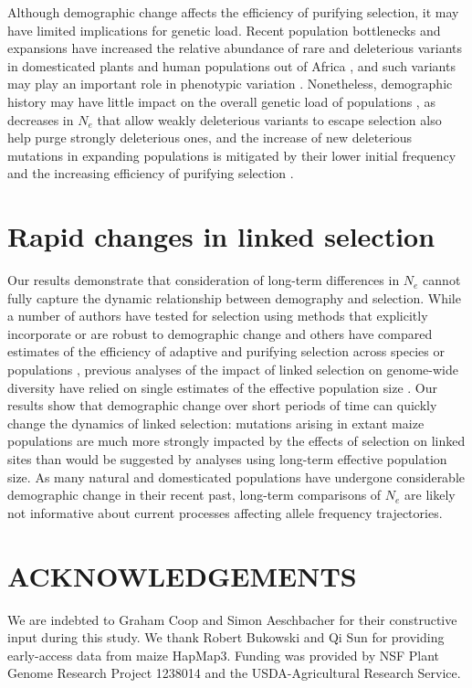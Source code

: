 \documentclass[12pt,a4paper]{article}
\begin{document}
Although demographic change affects the efficiency of purifying selection, it may have limited implications for genetic load. 
Recent population bottlenecks and expansions have increased the relative abundance of rare and 
deleterious variants in domesticated plants \cite{Gunther:2010gt,renaut2015} and human populations out of Africa \cite{keinan2012,coventry2010}, and such variants may play an important role in phenotypic variation \cite{Mezmouk:2014es, coventry2010, eyre2010}.
Nonetheless, demographic history may have little impact on the overall genetic load of populations \cite{do2015,simons2014}, as decreases in $N_e$ that allow weakly deleterious variants to escape selection also help purge strongly deleterious ones, and the increase of new deleterious mutations in expanding populations is mitigated by their lower initial frequency and the increasing efficiency of purifying selection \cite{gazave2013, simons2014, lohmueller2014}. 

\section*{Rapid changes in linked selection} %
Our results demonstrate that consideration of long-term differences in $N_e$ cannot fully capture the dynamic relationship between demography and selection. 
While a number of authors have tested for selection using methods that explicitly incorporate or are robust to demographic change \cite{eyre2009estimating, chen2010, zeng2010} and others have compared estimates of the efficiency of adaptive and purifying selection across species \cite{popadin2012} or populations \cite{Elyashiv:2010ga}, previous analyses of the impact of linked selection on genome-wide diversity have relied on single estimates of the effective population size \cite{corbett2015,leffler2012}.
Our results show that demographic change over short periods of time can quickly change the dynamics of linked selection: mutations arising in extant maize populations are much more strongly impacted by the effects of selection on linked sites than would be suggested by analyses using long-term effective population size.
As many natural and domesticated populations have undergone considerable demographic change in their recent past, long-term comparisons of $N_e$ are likely not informative about current processes affecting allele frequency trajectories.

\section*{ACKNOWLEDGEMENTS}
We are indebted to Graham Coop and Simon Aeschbacher for their constructive input during this study. We thank Robert Bukowski and Qi Sun for providing early-access data from maize HapMap3. Funding was provided by NSF Plant Genome Research Project 1238014 and the USDA-Agricultural Research Service.
\end{document}
